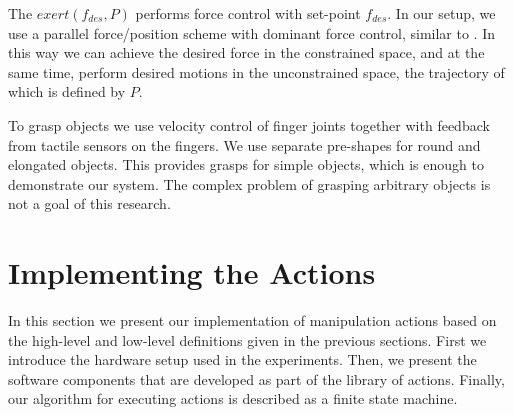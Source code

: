 The $exert(f_{des},P)$ performs force control with set-point $f_{des}$.
In our setup, we use a parallel force/position scheme with dominant force control, similar to \cite{chiaverini1993parallel}.
In this way we can achieve the desired force in the constrained space, and at the same time, perform desired motions in the unconstrained space,
the trajectory of which is defined by $P$.

To grasp objects we use velocity control of finger joints together with feedback from tactile sensors on the fingers.
We use separate pre-shapes for round and elongated objects.
This provides grasps for simple objects, which is enough to demonstrate our system.
The complex problem of grasping arbitrary objects is not a goal of this research.


\section{Implementing the Actions}
\label{sec:Implementing}

In this section we present our implementation of manipulation actions based on the high-level and low-level definitions given in the previous sections.
First we introduce the hardware setup used in the experiments.
Then, we present the software components that are developed as part of the library of actions.
Finally, our algorithm for executing actions is described as a finite state machine.

